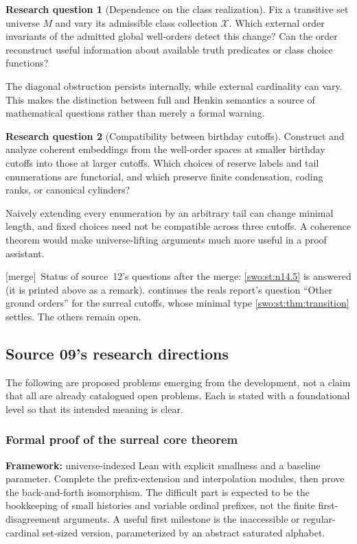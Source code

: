 \documentclass[11pt]{article}
\theoremstyle{definition}
\newtheorem{question}[question]{Research question}
\theoremstyle{remark}
\newcommand{\merge}{\textsf{[merge]}}
\begin{document}
\begin{question}[Dependence on the class realization]\label{swo:st:n14.8}
Fix a transitive set universe $M$ and vary its admissible class collection
$\mathcal X$. Which external order invariants of the admitted global
well-orders detect this change? Can the order reconstruct useful
information about available truth predicates or class choice functions?
\end{question}
The diagonal obstruction persists internally, while external cardinality
can vary. This makes the distinction between full and Henkin semantics a
source of mathematical questions rather than merely a formal warning.

\begin{question}[Compatibility between birthday cutoffs]\label{swo:st:n14.9}
Construct and analyze coherent embeddings from the well-order spaces at
smaller birthday cutoffs into those at larger cutoffs. Which choices of
reserve labels and tail enumerations are functorial, and which preserve
finite condensation, coding ranks, or canonical cylinders?
\end{question}
Naively extending every enumeration by an arbitrary tail can change
minimal length, and fixed choices need not be compatible across three
cutoffs. A coherence theorem would make universe-lifting arguments much
more useful in a proof assistant.


\merge\ Status of source~12's questions after the merge: \cref{swo:st:n14.5} is
answered (it is printed above as a remark).  continues the
reals report's question ``Other ground orders'' for the surreal cutoffs, whose
minimal type \cref{swo:st:thm:transition} settles. The others remain open.

\subsection{Source 09's research directions}
\label{swo:ec:sec:research}
The following are proposed problems emerging from the development, not
a claim that all are already catalogued open problems. Each is stated
with a foundational level so that its intended meaning is clear.

\subsubsection{Formal proof of the surreal core theorem}
\textbf{Framework:} universe-indexed Lean with explicit smallness and a
baseline parameter. Complete the prefix-extension and interpolation
modules, then prove the back-and-forth isomorphism. The difficult part
is expected to be the bookkeeping of small histories and variable
ordinal prefixes, not the finite first-disagreement arguments. A useful
first milestone is the inaccessible or regular-cardinal set-sized
version, parameterized by an abstract saturated alphabet.
\end{document}
